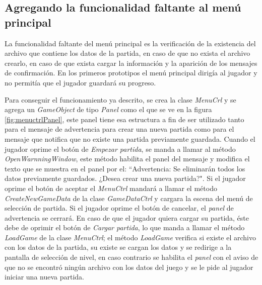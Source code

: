 \subsection{Agregando la funcionalidad faltante al menú principal}
La funcionalidad faltante del menú principal es la verificación de la existencia 
del archivo que contiene los datos de la partida, en caso de que no exista el 
archivo crearlo, en caso de que exista cargar la información y la aparición de 
los mensajes de confirmación. En los primeros prototipos el menú principal 
dirigía al jugador y no permitía que el jugador guardará su progreso.
\\
\par
Para conseguir el funcionamiento ya descrito, se crea la clase \textit{MenuCrl} 
y se agrega un \textit{GameObject} de tipo \textit{Panel} como el que se ve en 
la figura \ref{fig:menuctrlPanel}, este panel tiene esa estructura a fin de ser 
utilizado tanto para el mensaje de advertencia para crear una nueva partida como 
para el mensaje que notifica que no existe una partida previamente guardada.
Cuando el jugador oprime el botón de \textit{Empezar partida}, se manda a llamar 
al método \textit{OpenWarnningWindow}, este método habilita el panel del mensaje 
y modifica el texto que se muestra en el panel por el: “Advertencia: Se 
eliminarán todos los datos previamente guardados. ¿Desea crear una nueva 
partida?". Si el jugador oprime el botón de aceptar el \textit{MenuCtrl} mandará 
a llamar el método \textit{CreateNewGameData} de la clase \textit{GameDataCtrl} 
y cargara la escena del menú de selección de partida. Si el jugador oprime el 
botón de cancelar, el \textit{panel} de advertencia se cerrará. En caso de que 
el jugador quiera cargar su partida, éste debe de oprimir el botón de 
\textit{Cargar partida}, lo que manda a llamar el método \textit{LoadGame} de la 
clase \textit{MenuCtrl}; el método \textit{LoadGame} verifica si existe el 
archivo con los datos de la partida, su existe se cargan los datos y se redirige 
a la pantalla de selección de nivel, en caso contrario se habilita el 
\textit{panel} con el aviso de que no se encontró ningún archivo con los datos 
del juego y se le pide al jugador iniciar una nueva partida. 

